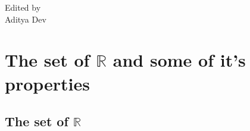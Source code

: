 \documentclass{notes}
\begin{document}
\begin{titlepage}
		
		
		\vfill %
		
		
		
		\vspace{0.3\baselineskip} %
		
		
		{\large Edited by\\  Aditya Dev} 
		
	\end{titlepage}
	\tableofcontents
\chapter{The set of $\mathbb{R}$ and some of it's properties}

\section{The set of $\mathbb{R}$}
\end{document}
